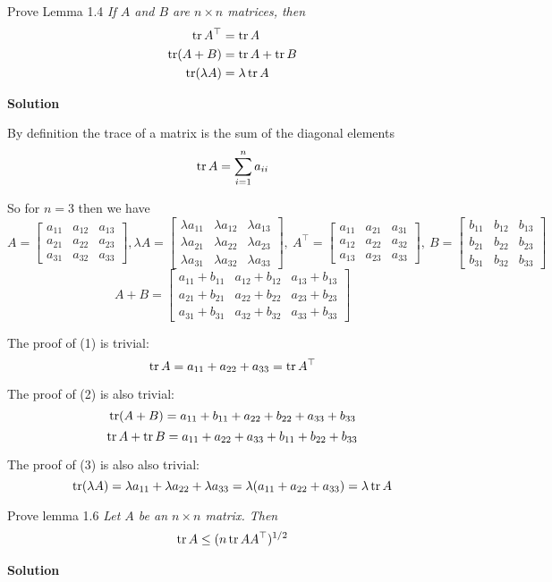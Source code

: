 
\begin{homeworkProblem}
  Prove Lemma 1.4 \textit{If $A$ and $B$ are $n \times n$ matrices, then}
\begin{align}
  \operatorname{tr} A^\top &= \operatorname{tr} A\\
  \operatorname{tr}(A + B) &= \operatorname{tr} A + \operatorname{tr} B\\
  \operatorname{tr}(\lambda A) &= \lambda \operatorname{tr} A
\end{align}

\textbf{Solution}

By definition the trace of a matrix is the sum of the diagonal elements
\[
  \operatorname{tr} A = \sum_{i=1}^n a_{ii}
\]

So for $n = 3$ then we have
\[
  A = \begin{bmatrix}
  a_{11} & a_{12} & a_{13}\\
  a_{21} & a_{22} & a_{23}\\
  a_{31} & a_{32} & a_{33}
\end{bmatrix}, \lambda A = \begin{bmatrix}
\lambda a_{11} & \lambda a_{12} & \lambda a_{13}\\
\lambda a_{21} & \lambda a_{22} & \lambda a_{23}\\
\lambda a_{31} & \lambda a_{32} & \lambda a_{33}
\end{bmatrix},\ A^\top = \begin{bmatrix}
a_{11} & a_{21} & a_{31}\\
a_{12} & a_{22} & a_{32}\\
a_{13} & a_{23} & a_{33}
\end{bmatrix}, \ B = \begin{bmatrix}
b_{11} & b_{12} & b_{13}\\
b_{21} & b_{22} & b_{23}\\
b_{31} & b_{32} & b_{33}
\end{bmatrix}
\]
\[
A + B = \begin{bmatrix}
a_{11} + b_{11} & a_{12} + b_{12} & a_{13} + b_{13}\\
a_{21} + b_{21} & a_{22} + b_{22} & a_{23} + b_{23}\\
a_{31} + b_{31} & a_{32} + b_{32} & a_{33} + b_{33}
\end{bmatrix}
\]

The proof of (1) is trivial:
\[
  \operatorname{tr} A = a_{11} + a_{22} + a_{33} = \operatorname{tr} A^\top
\]

The proof of (2) is also trivial:
\[
  \operatorname{tr} (A+B) = a_{11} + b_{11} + a_{22} + b_{22} + a_{33} + b_{33}
\]
\[
  \operatorname{tr} A + \operatorname{tr} B = a_{11} + a_{22} + a_{33} + b_{11} + b_{22} + b_{33}
\]

The proof of (3) is also also trivial:
\[
  \operatorname{tr}(\lambda A) = \lambda a_{11} + \lambda a_{22} + \lambda a_{33} = \lambda (a_{11} + a_{22} + a_{33})
  = \lambda \operatorname{tr} A
\]

\end{homeworkProblem}

\pagebreak

\begin{homeworkProblem}
  Prove lemma 1.6 \textit{Let $A$ be an $n \times n$ matrix. Then}
  \begin{align}
      \operatorname{tr} A \leq (n \operatorname{tr} AA^\top)^{1/2}
  \end{align}

  \textbf{Solution}

  

\end{homeworkProblem}

